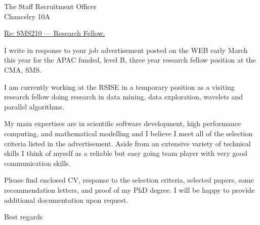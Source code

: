 \documentclass[12pt]{letter}
\begin{document}
\address{       Dr.\ Ole M{\o}ller Nielsen     \\
                Computer Sciences Laboratory, RSISE   \\
                Australian National University \\
                Canberra, ACT 0200     \\
                Ph: +61 2 6279 8627 \\
                email: Ole.Nielsen@anu.edu.au}


\signature{Ole M{\o}ller Nielsen}

\begin{letter}
{The Staff Recruitment Officer  \\
Chancelry 10A} 
 
\opening{\underline{Re: SMS210 --- Research Fellow.}}

I write in response to your job advertisement posted on the WEB 
early March this year for the APAC funded, level B, three year 
research fellow position at the CMA, SMS.

I am currently working at the RSISE in a temporary position as
a visiting research fellow doing research in data mining, 
data exploration, wavelets and parallel algorithms.

My main expertises are in scientific software development,
high performance computing, and mathematical modelling 
and I believe I meet all of the selection criteria 
listed in the advertisement.
Aside from an extensive variety of technical skills 
I think of myself as a reliable but easy going team player with 
very good communication skills.

Please find enclosed CV, response to the selection criteria, 
selected papers, some recommendation letters, and proof of my PhD degree.
I will be happy to provide additional documentation upon request.

\vspace{1cm}
\closing{Best regards}

\end{letter}
\end{document}
